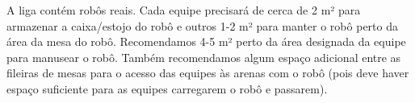 \documentclass[11pt, twoside, openright, a4paper, chapterprefix]{article}
\begin{document}
A liga contém robôs reais. Cada equipe precisará de cerca de 2 m² para armazenar a caixa/estojo do robô e outros 1-2 m² para manter o robô perto da área da mesa do robô. Recomendamos 4-5 m² perto da área designada da equipe para manusear o robô. Também recomendamos algum espaço adicional entre as fileiras de mesas para o acesso das equipes às arenas com o robô (pois deve haver espaço suficiente para as equipes carregarem o robô e passarem).
\end{document}
